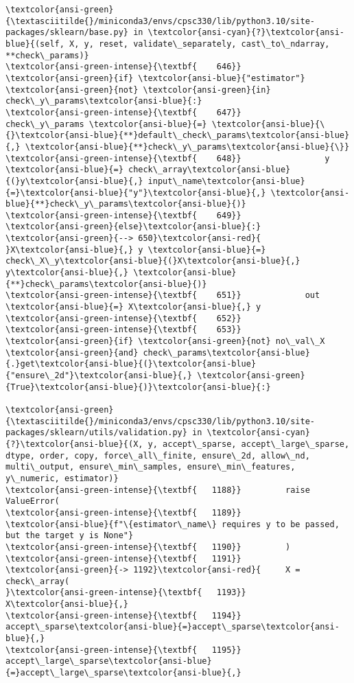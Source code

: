 \documentclass[11pt]{article}
\begin{document}
\begin{Verbatim}[commandchars=\\\{\}, frame=single, framerule=2mm, rulecolor=\color{outerrorbackground}]
\textcolor{ansi-green}{\textasciitilde{}/miniconda3/envs/cpsc330/lib/python3.10/site-packages/sklearn/base.py} in \textcolor{ansi-cyan}{?}\textcolor{ansi-blue}{(self, X, y, reset, validate\_separately, cast\_to\_ndarray, **check\_params)}
\textcolor{ansi-green-intense}{\textbf{    646}}                 \textcolor{ansi-green}{if} \textcolor{ansi-blue}{"estimator"} \textcolor{ansi-green}{not} \textcolor{ansi-green}{in} check\_y\_params\textcolor{ansi-blue}{:}
\textcolor{ansi-green-intense}{\textbf{    647}}                     check\_y\_params \textcolor{ansi-blue}{=} \textcolor{ansi-blue}{\{}\textcolor{ansi-blue}{**}default\_check\_params\textcolor{ansi-blue}{,} \textcolor{ansi-blue}{**}check\_y\_params\textcolor{ansi-blue}{\}}
\textcolor{ansi-green-intense}{\textbf{    648}}                 y \textcolor{ansi-blue}{=} check\_array\textcolor{ansi-blue}{(}y\textcolor{ansi-blue}{,} input\_name\textcolor{ansi-blue}{=}\textcolor{ansi-blue}{"y"}\textcolor{ansi-blue}{,} \textcolor{ansi-blue}{**}check\_y\_params\textcolor{ansi-blue}{)}
\textcolor{ansi-green-intense}{\textbf{    649}}             \textcolor{ansi-green}{else}\textcolor{ansi-blue}{:}
\textcolor{ansi-green}{--> 650}\textcolor{ansi-red}{                 }X\textcolor{ansi-blue}{,} y \textcolor{ansi-blue}{=} check\_X\_y\textcolor{ansi-blue}{(}X\textcolor{ansi-blue}{,} y\textcolor{ansi-blue}{,} \textcolor{ansi-blue}{**}check\_params\textcolor{ansi-blue}{)}
\textcolor{ansi-green-intense}{\textbf{    651}}             out \textcolor{ansi-blue}{=} X\textcolor{ansi-blue}{,} y
\textcolor{ansi-green-intense}{\textbf{    652}} 
\textcolor{ansi-green-intense}{\textbf{    653}}         \textcolor{ansi-green}{if} \textcolor{ansi-green}{not} no\_val\_X \textcolor{ansi-green}{and} check\_params\textcolor{ansi-blue}{.}get\textcolor{ansi-blue}{(}\textcolor{ansi-blue}{"ensure\_2d"}\textcolor{ansi-blue}{,} \textcolor{ansi-green}{True}\textcolor{ansi-blue}{)}\textcolor{ansi-blue}{:}

\textcolor{ansi-green}{\textasciitilde{}/miniconda3/envs/cpsc330/lib/python3.10/site-packages/sklearn/utils/validation.py} in \textcolor{ansi-cyan}{?}\textcolor{ansi-blue}{(X, y, accept\_sparse, accept\_large\_sparse, dtype, order, copy, force\_all\_finite, ensure\_2d, allow\_nd, multi\_output, ensure\_min\_samples, ensure\_min\_features, y\_numeric, estimator)}
\textcolor{ansi-green-intense}{\textbf{   1188}}         raise ValueError(
\textcolor{ansi-green-intense}{\textbf{   1189}}             \textcolor{ansi-blue}{f"\{estimator\_name\} requires y to be passed, but the target y is None"}
\textcolor{ansi-green-intense}{\textbf{   1190}}         )
\textcolor{ansi-green-intense}{\textbf{   1191}} 
\textcolor{ansi-green}{-> 1192}\textcolor{ansi-red}{     X = check\_array(
}\textcolor{ansi-green-intense}{\textbf{   1193}}         X\textcolor{ansi-blue}{,}
\textcolor{ansi-green-intense}{\textbf{   1194}}         accept\_sparse\textcolor{ansi-blue}{=}accept\_sparse\textcolor{ansi-blue}{,}
\textcolor{ansi-green-intense}{\textbf{   1195}}         accept\_large\_sparse\textcolor{ansi-blue}{=}accept\_large\_sparse\textcolor{ansi-blue}{,}


\end{Verbatim}
\end{document}
